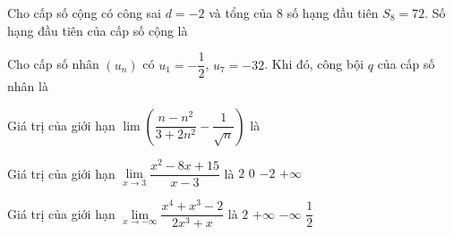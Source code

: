 \begin{ex}%
	Cho cấp số cộng có công sai $d=-2$ và tổng của $8$ số hạng đầu tiên $S_8=72$. Số hạng đầu tiên của cấp số cộng là
\end{ex}
\begin{ex}%
	Cho cấp số nhân $\left(u_n\right)$ có $u_1=-\dfrac{1}{2}$, $u_7=-32$. Khi đó, công bội $q$ của cấp số nhân là
\end{ex}
\begin{ex}%
	Giá trị của giới hạn $\lim \left(\dfrac{n-n^2}{3+2n^2}-\dfrac{1}{\sqrt{n}}\right)$ là
\end{ex}
\begin{ex}%
	Giá trị của giới hạn  $\lim\limits_{x\to 3}\dfrac{x^2-8x+15}{x-3}$ là
	\choice
	{$2$}
	{$0$}
	{\True $-2$}
	{$+\infty$}
\end{ex}

\begin{ex}%
	Giá trị của giới hạn $\lim \limits_{x\to -\infty} \dfrac{x^4+x^3-2}{2x^3+x}$ là
	\choice
	{$2$}
	{$+\infty$}
	{\True $-\infty$}
	{$\dfrac{1}{2}$}
\end{ex}

